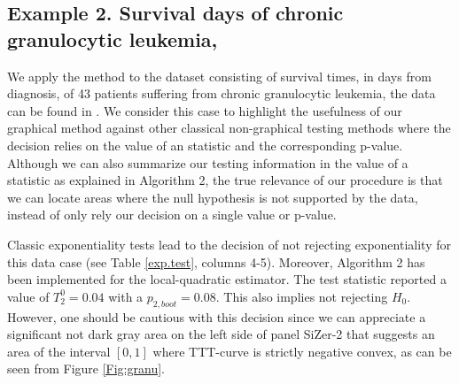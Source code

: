 \documentclass[preprint,12pt]{elsarticle}
\begin{document}
\subsection*{Example 2. Survival days of chronic granulocytic leukemia, \cite{BS69}}
We apply the method to the dataset consisting of survival times, in days from diagnosis, of 43 patients suffering from chronic granulocytic leukemia, the data can be found in \cite{KA2014}.
We consider this case to highlight the usefulness of our graphical method against other classical non-graphical testing methods where the decision relies on the value of an statistic and the corresponding p-value. 
Although we can also summarize our testing information in the value of a statistic as explained in Algorithm 2, the true relevance of our procedure is that we can locate areas where the null hypothesis is not supported by the data, instead of only rely our decision on a single value or p-value. 

Classic exponentiality tests lead to the decision of not rejecting exponentiality for this data case (see Table \ref{exp.test}, columns 4-5). Moreover, Algorithm 2 has been implemented for the local-quadratic estimator. The test statistic reported a value of $T_2^0=0.04$ with a $p_{2,boot}=0.08$. This also implies not rejecting $H_0$. However, one should be cautious with this decision since  we can appreciate a significant not dark gray area on the left side of panel SiZer-2 that suggests an area of the interval $[0,1]$ where TTT-curve is strictly negative convex, as can be seen from Figure \ref{Fig:granu}.
\end{document}
